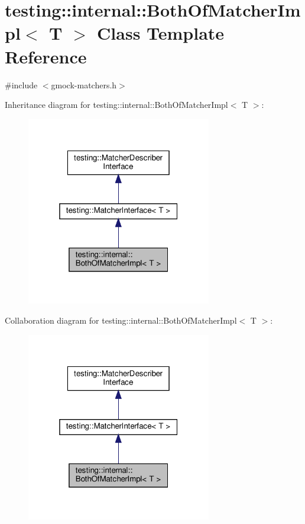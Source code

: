 \hypertarget{classtesting_1_1internal_1_1_both_of_matcher_impl}{}\section{testing\+:\+:internal\+:\+:Both\+Of\+Matcher\+Impl$<$ T $>$ Class Template Reference}
\label{classtesting_1_1internal_1_1_both_of_matcher_impl}


{\ttfamily \#include $<$gmock-\/matchers.\+h$>$}



Inheritance diagram for testing\+:\+:internal\+:\+:Both\+Of\+Matcher\+Impl$<$ T $>$\+:
\nopagebreak
\begin{figure}[H]
\begin{center}
\leavevmode
\includegraphics[width=229pt]{classtesting_1_1internal_1_1_both_of_matcher_impl__inherit__graph}
\end{center}
\end{figure}


Collaboration diagram for testing\+:\+:internal\+:\+:Both\+Of\+Matcher\+Impl$<$ T $>$\+:
\nopagebreak
\begin{figure}[H]
\begin{center}
\leavevmode
\includegraphics[width=229pt]{classtesting_1_1internal_1_1_both_of_matcher_impl__coll__graph}
\end{center}
\end{figure}
